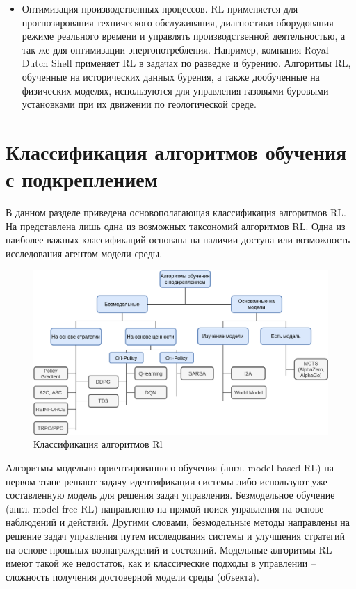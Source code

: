 \begin{itemize}[]
	\item Оптимизация производственных процессов.  RL применяется для прогнозирования технического обслуживания, диагностики оборудования режиме реального времени и управлять производственной деятельностью, а так же для оптимизации энергопотребления.\cite{waschneck2018optimization}
	Например, компания Royal Dutch Shell применяет RL в задачах по разведке и бурению. Алгоритмы RL, обученные на исторических данных бурения, а также дообученные на физических моделях, используются для управления газовыми буровыми установками при их движении по геологической среде.
\end{itemize}
%
%
\section{Классификация алгоритмов обучения с подкреплением}
В данном разделе приведена основополагающая классификация алгоритмов RL. На  представлена лишь одна из возможных таксономий алгоритмов RL. Одна из наиболее важных классификаций основана на наличии доступа или возможность исследования агентом модели среды.\\
\begin{figure}[!h]
	\centering
	\includegraphics[width=0.7\linewidth]{my_folder/figure/schema/classification_RL.png}
	\caption{Классификация алгоритмов Rl}
	\label{fig:classification-ch1}
\end{figure}

Алгоритмы модельно-ориентированного обучения (англ. model-based RL) на первом этапе решают задачу идентификации системы либо используют уже составленную модель для решения задач управления. Безмодельное обучение (англ. model-free RL) направленно на прямой поиск управления на основе наблюдений и действий. Другими словами, безмодельные методы направлены на решение задач управления путем исследования системы и улучшения стратегий на основе прошлых вознаграждений и состояний. Модельные алгоритмы RL имеют такой же недостаток, как и классические подходы в управлении -- сложность получения достоверной модели среды (объекта).

